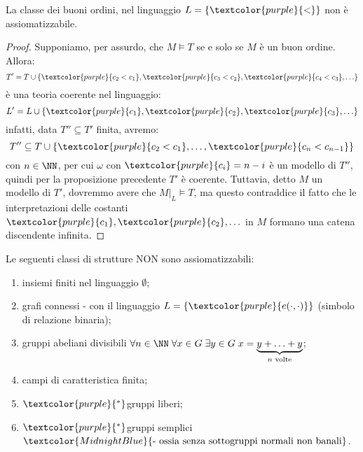 \begin{example}
    La classe dei buoni ordini, nel linguaggio $L = \{\textcolor{purple}{<}\}$ non è assiomatizzabile.
\end{example}

\begin{proof}
    Supponiamo, per assurdo, che $M \models T$ se e solo se $M$ è un buon ordine. Allora:
    \[ T' = T \cup \{\textcolor{purple}{c_2 < c_1}, \textcolor{purple}{c_3 < c_2}, \textcolor{purple}{c_4 < c_3}, \ldots\}
    \]
    è una teoria coerente nel linguaggio:
    \[ L' = L \cup \{\textcolor{purple}{c_1}, \textcolor{purple}{c_2}, \textcolor{purple}{c_3}, \ldots\}
    \]
    infatti, data $T'' \subseteq T'$ finita, avremo:
    \[ T'' \subseteq T \cup \{\textcolor{purple}{c_2 < c_1}, \ldots, \textcolor{purple}{c_n < c_{n-1}}\}
    \]
    con $n \in \NN$, per cui $\omega$ con $\textcolor{purple}{c_i} = n - i$ è un modello di $T''$, quindi per la proposizione precedente $T'$ è coerente.
    Tuttavia, detto $M$ un modello di $T'$, dovremmo avere che $M|_{L}\models T$, ma questo contraddice il fatto che le interpretazioni delle costanti $\textcolor{purple}{c_1}, \textcolor{purple}{c_2}, \ldots$ in $M$
    formano una catena discendente infinita.
\end{proof}

\begin{exercise}
    Le seguenti classi di strutture NON sono assiomatizzabili:
    \begin{enumerate}
        \item insiemi finiti nel linguaggio $\emptyset$;
        \item grafi connessi - con il linguaggio $L = \{\textcolor{purple}{e(\cdot,\cdot)}\}$ (simbolo di relazione binaria);
        \item gruppi abeliani divisibili \textcolor{MidnightBlue}{$\forall n \in \NN \;\forall x \in G \;\exists y \in G \; x = \underbrace{y + \ldots + y}_{\text{$n$ volte}}$};
        \item campi di caratteristica finita;
        \item $\textcolor{purple}{{}^*}$gruppi liberi;
        \item $\textcolor{purple}{{}^*}$gruppi semplici $\textcolor{MidnightBlue}{\text{- ossia senza sottogruppi normali non banali}}$.
    \end{enumerate}
\end{exercise}

